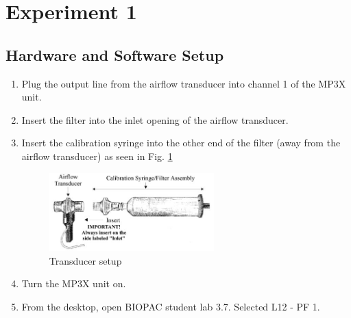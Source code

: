\documentclass{article}
\begin{document}
\section*{Experiment 1}
\subsection*{Hardware and Software Setup}
\begin{enumerate}
	\item Plug the output line from the airflow transducer into channel 1 of the MP3X unit.
	\item Insert the filter into the inlet opening of the airflow transducer.
	\item Insert the calibration syringe into the other end of the filter (away from the airflow transducer) as seen in Fig. \ref{xdc}
		\begin{figure}[h]
	\centering\includegraphics[width=0.6\textwidth]{../images/PF_I_4.jpg}
		\caption{Transducer setup}
		\label{xdc}
		\end{figure}
		
	\item Turn the MP3X unit on.
	\item From the desktop, open BIOPAC student lab 3.7. Selected L12 - PF 1.
\end{enumerate}
\end{document}
